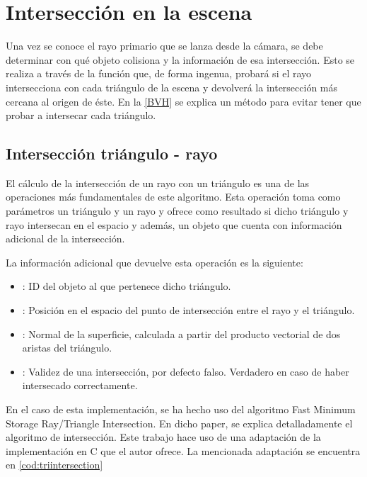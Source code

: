 \section{Intersección en la escena}
\label{sec:throwray}

Una vez se conoce el rayo primario que se lanza desde la cámara, se debe determinar con qué objeto colisiona y la información de esa intersección. Esto se realiza a través de la función  que, de forma ingenua, probará si el rayo intersecciona con cada triángulo de la escena y devolverá la intersección más cercana al origen de éste. En la \autoref{BVH} se explica un método para evitar tener que probar a intersecar cada triángulo.

\subsection{Intersección triángulo - rayo}
\label{subsec:triintersection}
	
El cálculo de la intersección de un rayo con un triángulo es una de las operaciones más fundamentales de este algoritmo. Esta operación toma como parámetros un triángulo  y un rayo  y ofrece como resultado si dicho triángulo y rayo intersecan en el espacio y además, un objeto  que cuenta con información adicional de la intersección.

La información adicional que devuelve esta operación es la siguiente:

\begin{itemize}
	
	\item {}: ID del objeto al que pertenece dicho triángulo.
	
	\item {}: Posición en el espacio del punto de intersección entre el rayo y el triángulo.
	
	\item {}: Normal de la superficie, calculada a partir del producto vectorial de dos aristas del triángulo.
	
	\item {}: Validez de una intersección, por defecto falso. Verdadero en caso de haber intersecado correctamente.

\end{itemize}

En el caso de esta implementación, se ha hecho uso del algoritmo Fast Minimum Storage Ray/Triangle Intersection\cite{moller1997fast}. En dicho paper, se explica detalladamente el algoritmo de intersección. Este trabajo hace uso de una adaptación de la implementación en C que el autor ofrece. La mencionada adaptación se encuentra en \autoref{cod:triintersection}
	
